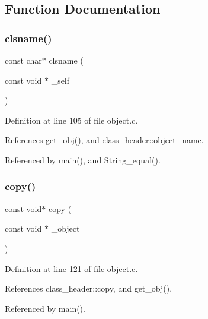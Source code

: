 \subsection{Function Documentation}
\mbox{\label{group__common_gadcc35aece3f8a4c822a9bf2a591f087b}} 
\subsubsection{\texorpdfstring{clsname()}{clsname()}}
{\footnotesize\ttfamily const char$\ast$ clsname (\begin{DoxyParamCaption}\item[{const void $\ast$}]{\+\_\+self }\end{DoxyParamCaption})}



Definition at line 105 of file object.\+c.



References get\+\_\+obj(), and class\+\_\+header\+::object\+\_\+name.



Referenced by main(), and String\+\_\+equal().

\mbox{\label{group__common_gab08ed4d7b5aa115383f38057e006be9d}} 
\subsubsection{\texorpdfstring{copy()}{copy()}}
{\footnotesize\ttfamily const void$\ast$ copy (\begin{DoxyParamCaption}\item[{const void $\ast$}]{\+\_\+object }\end{DoxyParamCaption})}



Definition at line 121 of file object.\+c.



References class\+\_\+header\+::copy, and get\+\_\+obj().



Referenced by main().

\mbox{\label{group__common_gae293fe2fbbf9f2e8a87c1141e7412814}} 
